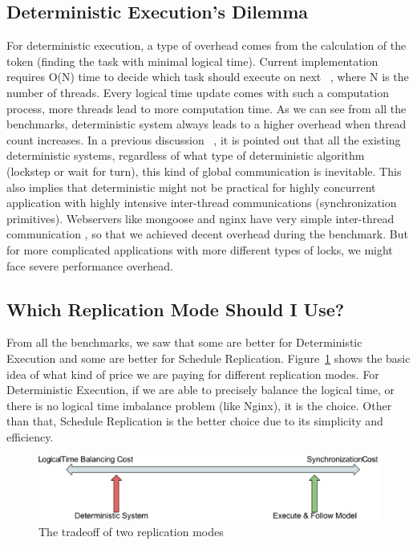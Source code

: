 \subsection{Deterministic Execution's Dilemma}
For deterministic execution, a type of overhead comes from the calculation of the token (finding the task with minimal logical time). Current implementation requires O(N) time to decide which task should execute on next \detstart\ , where N is the number of threads. Every logical time update comes with such a computation process, more threads lead to more computation time.  As we can see from all the benchmarks, deterministic system always leads to a higher overhead when thread count increases. In a previous discussion ~\cite{bergan2011deterministic}, it is pointed out that all the existing deterministic systems, regardless of what type of deterministic algorithm (lockstep or wait for turn), this kind of global communication is inevitable. This also implies that deterministic might not be practical for highly concurrent application with highly intensive inter-thread communications (synchronization primitives). Webservers like mongoose and nginx have very simple inter-thread communication , so that we achieved decent overhead during the benchmark. But for more complicated applications with more different types of locks, we might face severe performance overhead.

\subsection{Which Replication Mode Should I Use?}
From all the benchmarks, we saw that some are better for Deterministic Execution and some are better for Schedule Replication. Figure~\ref{f:trade_off} shows the basic idea of what kind of price we are paying for different replication modes. For Deterministic Execution, if we are able to precisely balance the logical time, or there is no logical time imbalance problem (like Nginx), it is the choice. Other than that, Schedule Replication is the better choice due to its simplicity and efficiency.

\begin{figure}
\centering
\includegraphics[width=0.8\columnwidth]{figures/tradeoff}
\caption{The tradeoff of two replication modes}
\label{f:trade_off}
\end{figure}